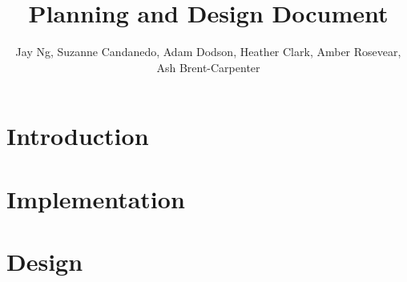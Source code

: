 \documentclass[]{IEEEtran}
\title{Planning and Design Document}
\author{Jay Ng, Suzanne Candanedo, Adam Dodson, Heather Clark, Amber Rosevear, Ash Brent-Carpenter}
\begin{document}
	\maketitle
	
	\begin{comment}
	You are also required to submit a Planning and Design Document. This should address the design of your software solution together with a detailed plan as to how (and when) this design is to be implemented. There are a number of things to consider in the design of software systems, including:
	
	Extensibility – how you can extend your solution given increasing demands; Robustness – how your solution will tolerate unpredictable or invalid input;
	
	Reliability – how the system will perform under everyday conditions;
	
	Correctness – how accurately your solution meets the requirements of the customer;
	
	Compatibility and portability – how easy your proposed system is to install and execute;
	
	Modularity and reuse – how well your system is divided into independent components and whether you have reused existing code;
	
	Security – whether your system can withstand hostile acts and influences;
	
	Fault-tolerance – whether your system can withstand and recover from component failure.
	
	This list is not exhaustive and there will be other concerns which your group will want to address. You will also want to adopt trusted design patterns or design methodologies to provide a template for the actual design of your system. No one method will be favoured (by the assessors) over another, but you will be graded on the process of selecting an appropriate methodology and your use of it.
	
	Each group must submit one Planning and Design Document and the report itself must not exceed ten sides of A4. Any appendices or other attachments will be removed.
	\end{comment}
	
	\begin{abstract}
	\end{abstract}

	\section{Introduction}
	
	\section{Implementation}
	
	\section{Design}

	\cite{test}
	


\end{document}

